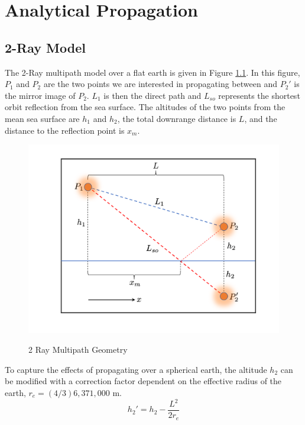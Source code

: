 \chapter{Analytical Propagation}
\label{analytical_propagation}

\section{2-Ray Model}
The 2-Ray multipath model over a flat earth is given in Figure \ref{mp_fig:1}. In this figure, $P_1$ and $P_2$ are the two points we are interested in propagating between and $P_2'$ is the mirror image of $P_2$. $L_1$ is then the direct path and $L_{so}$ represents the shortest orbit reflection from the sea surface. The altitudes of the two points from the mean sea surface are $h_1$ and $h_2$, the total downrange distance is $L$, and the distance to the reflection point is $x_m$.

\begin{figure}[H]
  \begin{center}
\includegraphics[width=5in]{../media/analysis/multipath_2_ray.png}
  \end{center}
  \renewcommand{\baselinestretch}{1} \small\normalsize
  \begin{quote}
    \caption[2 Ray Multipath Geometry]{ 2 Ray Multipath Geometry\label{mp_fig:1}}
  \end{quote}
\end{figure}
\renewcommand{\baselinestretch}{2} \small\normalsize

To capture the effects of propagating over a spherical earth, the altitude $h_2$ can be modified with a correction factor \cite{blake_radar} dependent on the effective radius of the earth, $r_e = (4/3) 6,371,000$ m.
\begin{equation}
h_2' = h_2 - \frac{L^2}{2r_e}
\label{mp_eq:0}
\end{equation}

